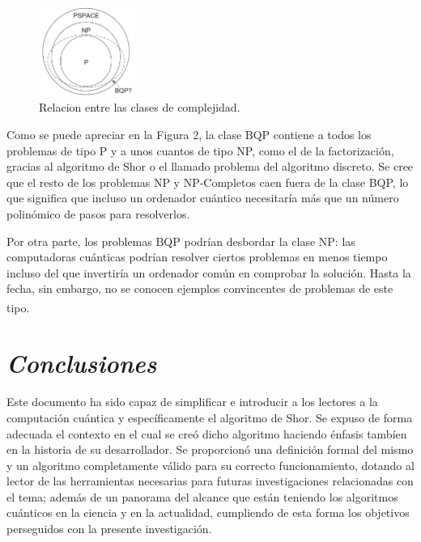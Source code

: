 \documentclass[a4paper,11pt]{article}
\begin{document}
\begin{figure}
    \vspace{-20pt}
    \begin{center}
        \includegraphics[width=0.28\textwidth]{diagrama.png}
    \end{center}
    \vspace{-20pt}
    \caption{Relacion entre las clases de complejidad.}
    \vspace{-10pt}
\end{figure}

\par Como se puede apreciar en la Figura 2, la clase BQP contiene a todos los problemas de tipo P y a unos cuantos de tipo NP, como el de la factorizaci\'on, gracias al algoritmo de Shor o el llamado problema del algoritmo discreto. Se cree que el resto de los problemas NP y NP-Completos caen fuera de la clase BQP, lo que significa que incluso un ordenador cu\'antico necesitar\'ia m\'as que un n\'umero polin\'omico de pasos para resolverlos.

\par Por otra parte, los problemas BQP podr\'ian desbordar la clase NP: las computadoras cu\'anticas podr\'ian resolver ciertos problemas en menos tiempo incluso del que invertir\'ia un ordenador com\'un en comprobar la soluci\'on. Hasta la fecha, sin embargo, no se conocen ejemplos convincentes de problemas de este tipo\textsuperscript{\textcolor{cyan}{\cite{4}}}.

\section*{\center\itshape\large Conclusiones}

\par Este documento ha sido capaz de simplificar e introducir a los lectores a la computaci\'on cu\'antica y espec\'ificamente el algoritmo de Shor. Se expuso de forma adecuada el contexto en el cual se cre\'o dicho algoritmo haciendo \'enfasis tamb\'ien en la historia de su desarrollador. Se proporcion\'o una definici\'on formal del mismo y un algoritmo completamente v\'alido para su correcto funcionamiento, dotando al lector de las herramientas necesarias para futuras investigaciones relacionadas con el tema; adem\'as de un panorama del alcance que est\'an teniendo los algoritmos cu\'anticos en la ciencia y en la actualidad, cumpliendo de esta forma los objetivos perseguidos con la presente investigaci\'on.
\end{document}
